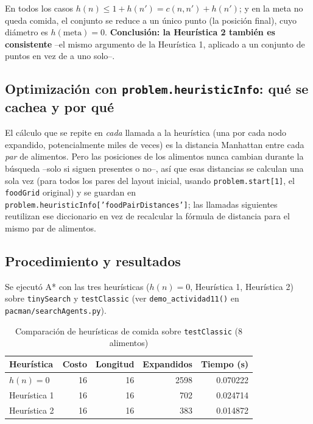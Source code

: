 En todos los casos $h(n) \le 1 + h(n') = c(n,n') + h(n')$; y en la meta no queda comida, el
conjunto se reduce a un único punto (la posición final), cuyo diámetro es $h(\text{meta}) = 0$.
\textbf{Conclusión: la Heurística 2 también es consistente} --el mismo argumento de la
Heurística 1, aplicado a un conjunto de puntos en vez de a uno solo--.

\subsection{Optimización con \texttt{problem.heuristicInfo}: qué se cachea y por qué}

El cálculo que se repite en \emph{cada} llamada a la heurística (una por cada nodo expandido,
potencialmente miles de veces) es la distancia Manhattan entre cada \emph{par} de alimentos. Pero
las posiciones de los alimentos nunca cambian durante la búsqueda --solo si siguen presentes o
no--, así que esas distancias se calculan una sola vez (para todos los pares del layout inicial,
usando \texttt{problem.start[1]}, el \texttt{foodGrid} original) y se guardan en
\texttt{problem.heuristicInfo['foodPairDistances']}; las llamadas siguientes reutilizan ese
diccionario en vez de recalcular la fórmula de distancia para el mismo par de alimentos.

\subsection{Procedimiento y resultados}

Se ejecutó A* con las tres heurísticas ($h(n)=0$, Heurística 1, Heurística 2) sobre
\texttt{tinySearch} y \texttt{testClassic} (ver \texttt{demo\_actividad11()} en \texttt{pacman/searchAgents.py}).

\begin{table}[H]
\centering
\caption{Comparación de heurísticas de comida sobre \texttt{testClassic} (8 alimentos)}
\label{tab:act11-comparacion}
\begin{tabular}{lrrrr}
\toprule
\textbf{Heurística} & \textbf{Costo} & \textbf{Longitud} & \textbf{Expandidos} & \textbf{Tiempo (s)} \\
\midrule
$h(n)=0$      & 16 & 16 & 2598 & 0.070222 \\
Heurística 1  & 16 & 16 &  702 & 0.024714 \\
Heurística 2  & 16 & 16 &  383 & 0.014872 \\
\bottomrule
\end{tabular}
\end{table}

